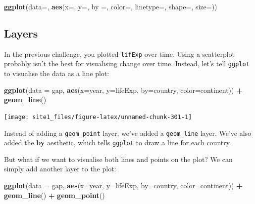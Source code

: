 \documentclass[]{book}
\newenvironment{Shaded}{\begin{snugshade}}{\end{snugshade}}
\newcommand{\KeywordTok}[1]{\textcolor[rgb]{0.13,0.29,0.53}{\textbf{#1}}}
\newcommand{\DataTypeTok}[1]{\textcolor[rgb]{0.13,0.29,0.53}{#1}}
\newcommand{\StringTok}[1]{\textcolor[rgb]{0.31,0.60,0.02}{#1}}
\newcommand{\OperatorTok}[1]{\textcolor[rgb]{0.81,0.36,0.00}{\textbf{#1}}}
\newcommand{\NormalTok}[1]{#1}
\begin{document}
\begin{Shaded}
\begin{Highlighting}[]
\KeywordTok{ggplot}\NormalTok{(}\DataTypeTok{data=}\NormalTok{, }\KeywordTok{aes}\NormalTok{(}\DataTypeTok{x=}\NormalTok{, }\DataTypeTok{y=}\NormalTok{, }\DataTypeTok{by =}\NormalTok{, }\DataTypeTok{color=}\NormalTok{, }\DataTypeTok{linetype=}\NormalTok{, }\DataTypeTok{shape=}\NormalTok{, }\DataTypeTok{size=}\NormalTok{))}
\end{Highlighting}
\end{Shaded}

\subsection{Layers}\label{layers}

In the previous challenge, you plotted \texttt{lifExp} over time. Using
a scatterplot probably isn't the best for visualising change over time.
Instead, let's tell \texttt{ggplot} to visualise the data as a line
plot:

\begin{Shaded}
\begin{Highlighting}[]
\KeywordTok{ggplot}\NormalTok{(}\DataTypeTok{data =}\NormalTok{ gap, }\KeywordTok{aes}\NormalTok{(}\DataTypeTok{x=}\NormalTok{year, }\DataTypeTok{y=}\NormalTok{lifeExp, }\DataTypeTok{by=}\NormalTok{country, }\DataTypeTok{color=}\NormalTok{continent)) }\OperatorTok{+}\StringTok{ }
\StringTok{  }\KeywordTok{geom_line}\NormalTok{()}
\end{Highlighting}
\end{Shaded}

\begin{center}\texttt{[image: site1\_files/figure-latex/unnamed-chunk-301-1]} \end{center}

Instead of adding a \texttt{geom\_point} layer, we've added a
\texttt{geom\_line} layer. We've also added the \textbf{by} aesthetic,
which tells \texttt{ggplot} to draw a line for each country.

But what if we want to visualise both lines and points on the plot? We
can simply add another layer to the plot:

\begin{Shaded}
\begin{Highlighting}[]
\KeywordTok{ggplot}\NormalTok{(}\DataTypeTok{data =}\NormalTok{ gap, }\KeywordTok{aes}\NormalTok{(}\DataTypeTok{x=}\NormalTok{year, }\DataTypeTok{y=}\NormalTok{lifeExp, }\DataTypeTok{by=}\NormalTok{country, }\DataTypeTok{color=}\NormalTok{continent)) }\OperatorTok{+}\StringTok{ }
\StringTok{  }\KeywordTok{geom_line}\NormalTok{() }\OperatorTok{+}\StringTok{ }
\StringTok{  }\KeywordTok{geom_point}\NormalTok{()}
\end{Highlighting}
\end{Shaded}
\end{document}
